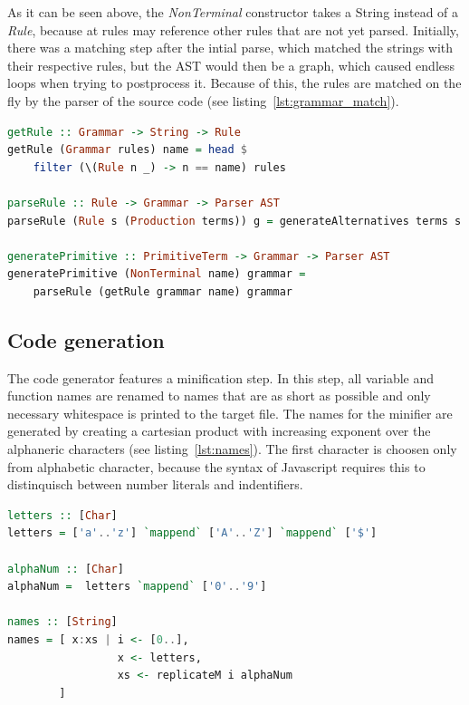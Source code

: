 As it can be seen above, the \textit{NonTerminal} constructor takes a String instead of a \textit{Rule}, because at rules may reference other rules that are not yet parsed. Initially, there was a matching step after the intial parse, which matched the strings with their respective rules, but the AST would then be a graph, which caused endless loops when trying to postprocess it. Because of this, the rules are matched on the fly by the parser of the source code (see listing~\ref{lst:grammar_match}).

\begin{lstlisting}[linewidth=\columnwidth, caption={Rule matching while parsing}, captionpos=b, label=lst:grammar_match, language=Haskell, breaklines=true]
getRule :: Grammar -> String -> Rule
getRule (Grammar rules) name = head $
    filter (\(Rule n _) -> n == name) rules

parseRule :: Rule -> Grammar -> Parser AST
parseRule (Rule s (Production terms)) g = generateAlternatives terms s g

generatePrimitive :: PrimitiveTerm -> Grammar -> Parser AST
generatePrimitive (NonTerminal name) grammar =
    parseRule (getRule grammar name) grammar
\end{lstlisting}

\subsection{Code generation}

The code generator features a minification step. In this step, all variable and function names are renamed to names that are as short as possible and only necessary whitespace is printed to the target file. The names for the minifier are generated by creating a cartesian product with increasing exponent over the alphaneric characters (see listing~\ref{lst:names}). The first character is choosen only from alphabetic character, because the syntax of Javascript requires this to distinquisch between number literals and indentifiers.

\begin{lstlisting}[linewidth=\columnwidth, caption={Endless list of possible variable names}, captionpos=b, label=lst:names, language=Haskell, breaklines=true]
letters :: [Char]
letters = ['a'..'z'] `mappend` ['A'..'Z'] `mappend` ['$']

alphaNum :: [Char]
alphaNum =  letters `mappend` ['0'..'9']

names :: [String]
names = [ x:xs | i <- [0..],
                 x <- letters,
                 xs <- replicateM i alphaNum
        ]
\end{lstlisting}

